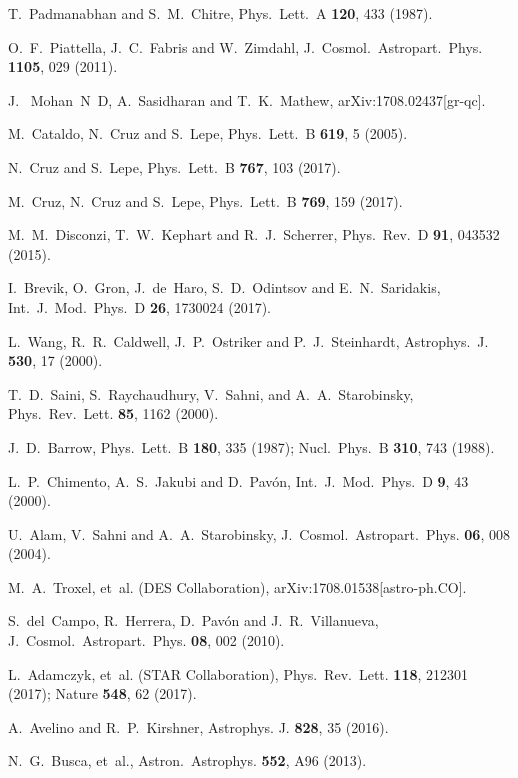 \documentclass[twocolumn,showpacs,nofootinbib,floats,amsmath,amssymb]{revtex4}
\begin{document}
\begin{thebibliography}{99}
T.~Padmanabhan and S.~M.~Chitre, Phys.\ Lett.\ A {\bf 120}, 433 (1987). 
 
O.~F.~Piattella, J.~C.~Fabris and W.~Zimdahl,  J.\ Cosmol.\ Astropart.\ Phys. {\bf 1105}, 029 (2011).

J.~ Mohan~N~D, A.~Sasidharan and T.~K.~Mathew, arXiv:1708.02437[gr-qc]. 
  
M.~Cataldo, N.~Cruz and S.~Lepe, Phys.\ Lett.\ B {\bf{619}}, 5 (2005).

N.~Cruz and S.~Lepe, Phys.\ Lett.\ B {\bf 767}, 103 (2017).

M.~Cruz, N.~Cruz and S.~Lepe, Phys.\ Lett.\ B {\bf 769}, 159 (2017).

M.~M.~Disconzi, T.~W.~Kephart and R.~J.~Scherrer, Phys.\ Rev.\ D {\bf 91}, 043532 (2015).

I.~Brevik, O.~Gron, J.~de~Haro, S.~D.~Odintsov and E.~N.~Saridakis, Int.\ J.\ Mod.\ Phys.\ D {\bf 26}, 1730024 (2017).

L.~Wang, R.~R.~Caldwell, J.~P.~Ostriker and P.~J.~Steinhardt, Astrophys.\ J. {\bf 530}, 17 (2000). 

T.~D.~Saini, S.~Raychaudhury, V.~Sahni, and A.~A.~Starobinsky, Phys.\ Rev.\ Lett. {\bf 85}, 1162 (2000).

J.~D.~Barrow, Phys.\ Lett.\ B {\bf 180}, 335 (1987); Nucl.\ Phys.\ B {\bf 310}, 743 (1988).

L.~P.~Chimento, A.~S.~Jakubi and D.~Pav\'on, Int.\ J.\ Mod.\ Phys.\ D {\bf 9}, 43 (2000).

U.~Alam, V.~Sahni and A.~A.~Starobinsky, J.\ Cosmol.\ Astropart.\ Phys. {\bf 06}, 008 (2004). 

M.~A.~Troxel, et~al. (DES Collaboration), arXiv:1708.01538[astro-ph.CO].

S.~del~Campo, R.~Herrera, D.~Pav\'on and J.~R.~Villanueva, J.\ Cosmol.\ Astropart.\ Phys. {\bf 08}, 002 (2010). 

L.~Adamczyk, et~al. (STAR Collaboration), Phys.~Rev.~Lett. {\bf 118}, 212301 (2017); Nature {\bf 548}, 62 (2017).

A.~Avelino and R.~P.~Kirshner, Astrophys. J. {\bf 828}, 35 (2016).

N.~G.~Busca, et~al., Astron.\ Astrophys. {\bf 552}, A96 (2013). 


\end{thebibliography}
\end{document}
